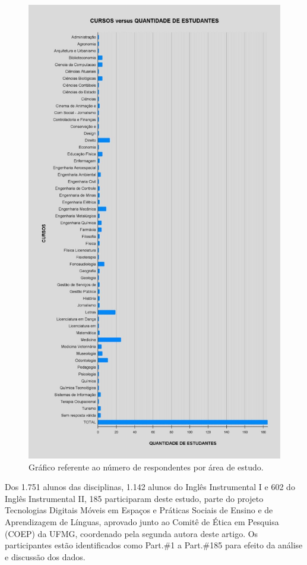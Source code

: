 \documentclass[portuguese]{textolivre}
\begin{document}
\begin{figure}[h!]
\centering
\begin{minipage}{.88\textwidth}
 \includegraphics[width=\textwidth]{figura1.jpg}
 \caption{Gráfico referente ao número de respondentes por área de estudo.}
 \label{fig01}
\end{minipage}
\end{figure}

Dos 1.751 alunos das disciplinas, 1.142 alunos do Inglês Instrumental I e 602 do Inglês Instrumental II, 185 participaram deste estudo, parte do projeto Tecnologias Digitais Móveis em Espaços e Práticas Sociais de Ensino e de Aprendizagem de Línguas, aprovado junto ao Comitê de Ética em Pesquisa (COEP) da UFMG, coordenado pela segunda autora deste artigo. Os participantes estão identificados como Part.\#1 a Part.\#185 para efeito da análise e discussão dos dados. 
\end{document}
